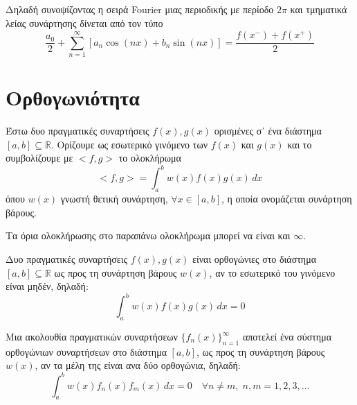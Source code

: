 \begin{rem}
  Δηλαδή συνοψίζοντας η σειρά Fourier μιας περιοδικής με περίοδο $ 2 \pi $ και 
  τμηματικά λείας συνάρτησης δίνεται από τον τύπο 
  \[
    \frac{a_{0}}{2} + \sum_{n=1}^{\infty} [a_{n} \cos{(nx)} + b_{n} \sin{(nx)}] =  
    \frac{f(x^{-}) + f(x^{+})}{2} 
  \] 
\end{rem}



\section{Ορθογωνιότητα}

\begin{dfn}
    Έστω δυο πραγματικές συναρτήσεις $ f(x), g(x) $ ορισμένες σ᾽ ένα διάστημα 
    $ [a,b] \subseteq \mathbb{R} $. Ορίζουμε ως \textcolor{Col1}{εσωτερικό γινόμενο} 
    των $ f(x) $ και $ g(x) $ και το συμβολίζουμε με $ <f,g> $ το ολοκλήρωμα
    \[
        <f,g> = \int _{a}^{b} w(x) f(x)g(x) \,{dx} 
    \] 
    όπου $ w(x) $ γνωστή θετική συνάρτηση, $ \forall x \in [a,b] $, η οποία 
    ονομάζεται \textcolor{Col1}{συνάρτηση βάρους}.
\end{dfn}

\begin{rem}
    Τα όρια ολοκλήρωσης στο παραπάνω ολοκλήρωμα μπορεί να είναι και $ \infty $.
\end{rem}

\begin{dfn}
    Δυο πραγματικές συναρτήσεις $ f(x), g(x) $ είναι \textcolor{Col1}{ορθογώνιες} 
    στο διάστημα $ [a,b] \subseteq \mathbb{R} $ ως προς τη συνάρτηση βάρους $ w(x) $, 
    αν το εσωτερικό του γινόμενο είναι μηδέν, δηλαδή:
    \[
        \int _{a}^{b} w(x)f(x)g(x) \,{dx} = 0
    \] 
\end{dfn}

\begin{dfn}
    Μια ακολουθία πραγματικών συναρτήσεων $ \{ f_{n}(x) \}_{n=1}^{\infty} $ αποτελεί 
    ένα σύστημα ορθογώνιων συναρτήσεων στο διάστημα $ [a,b] $, ως προς τη 
    συνάρτηση βάρους $ w(x) $, αν τα μέλη της είναι ανα δύο ορθογώνια, δηλαδή:
    \[
        \int _{a}^{b} w(x) f_{n}(x)f_{m}(x) \,{dx} = 0 \quad \forall n \neq m, \; n,m = 
        1,2,3, \ldots
    \] 
\end{dfn}

